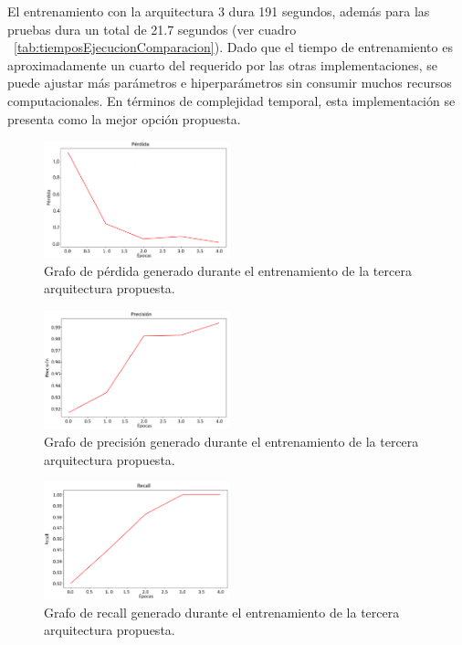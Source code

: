 \documentclass[conference, spanish, english]{IEEEtran}
\begin{document}
El entrenamiento con la arquitectura 3 dura 191 segundos, además para las pruebas dura un total de 21.7 segundos (ver cuadro ~\ref{tab:tiemposEjecucionComparacion}). Dado que el tiempo de entrenamiento es aproximadamente un cuarto del requerido por las otras implementaciones, se puede ajustar más parámetros e hiperparámetros sin consumir muchos recursos computacionales. En términos de complejidad temporal, esta implementación se presenta como la mejor opción propuesta.

\begin{figure}[H]
\centering
\includegraphics[width=0.48\textwidth]{training_plots/plot_architecture_4/loss_plot.png}
\caption{Grafo de pérdida generado durante el entrenamiento de la tercera arquitectura propuesta.}
\label{fig:perdidaArqui4}
\end{figure}


\begin{figure}[H]
\centering
\includegraphics[width=0.48\textwidth]{training_plots/plot_architecture_4/precision_plot.png}
\caption{Grafo de precisión generado durante el entrenamiento de la tercera arquitectura propuesta.}
\label{fig:precisionArqui4}
\end{figure}


\begin{figure}[H]
\centering
\includegraphics[width=0.48\textwidth]{training_plots/plot_architecture_4/recall_plot.png}
\caption{Grafo de recall generado durante el entrenamiento de la tercera arquitectura propuesta.}
\label{fig:recallArqui4}
\end{figure}
\end{document}
